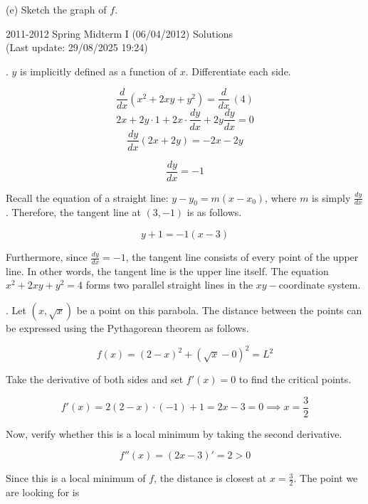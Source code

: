 \documentclass{article}
\begin{document}
\hfill

(e) Sketch the graph of $f$.

\newpage

\begin{center}
2011-2012 Spring Midterm I (06/04/2012) Solutions\\
(Last update: 29/08/2025 19:24)
\end{center}

. $y$ is implicitly defined as a function of $x$. Differentiate each side.

\[\frac{d}{dx}\left(x^2+2xy+y^2\right)=\frac{d}{dx}\,(4)\]
\[2x+2y\cdot1+2x\cdot\frac{dy}{dx}+2y\frac{dy}{dx}=0\]
\[\frac{dy}{dx}(2x+2y)=-2x-2y\]

\[\frac{dy}{dx}=-1\]

\hfill

\noindent Recall the equation of a straight line: $y-y_0=m(x-x_0)$, where $m$ is simply $\displaystyle \frac{dy}{dx}$. Therefore, the tangent line at $(3,-1)$ is as follows.

\[\boxed{y+1=-1(x-3)}\]

\hfill

\noindent Furthermore, since $\displaystyle \frac{dy}{dx}=-1$, the tangent line consists of every point of the upper line. In other words, the tangent line is the upper line itself. The equation $x^2+2xy+y^2=4$ forms two parallel straight lines in the $xy-$coordinate system.

\hfill

. Let $\left(x,\sqrt x\right)$ be a point on this parabola. The distance between the points can be expressed using the Pythagorean theorem as follows.

\[f(x)=(2-x)^2 + \left(\sqrt x - 0\right)^2=L^2\]

\hfill

\noindent Take the derivative of both sides and set $\displaystyle f'(x)=0$ to find the critical points.

\begin{equation*}
f'(x)=2(2-x)\cdot(-1) + 1 = 2x-3=0 \implies x=\frac{3}2
\end{equation*}

\hfill

\noindent Now, verify whether this is a local minimum by taking the second derivative.

\[f''(x)=(2x-3)'=2>0\]

\noindent Since this is a local minimum of $f$, the distance is closest at $\displaystyle x=\frac32$. The point we are looking for is
\end{document}
